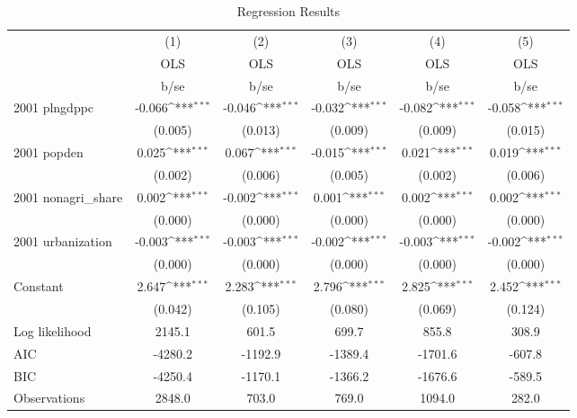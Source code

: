 \begin{table}[htbp]\centering
\def\sym#1{\ifmmode^{#1}\else\(^{#1}\)\fi}
\caption{Regression Results}
\begin{tabular}{l*{5}{c}}
\hline\hline
                    &\multicolumn{1}{c}{(1)}&\multicolumn{1}{c}{(2)}&\multicolumn{1}{c}{(3)}&\multicolumn{1}{c}{(4)}&\multicolumn{1}{c}{(5)}\\
                    &\multicolumn{1}{c}{OLS}&\multicolumn{1}{c}{OLS}&\multicolumn{1}{c}{OLS}&\multicolumn{1}{c}{OLS}&\multicolumn{1}{c}{OLS}\\
                    &        b/se         &        b/se         &        b/se         &        b/se         &        b/se         \\
\hline
2001 plngdppc       &      -0.066\sym{***}&      -0.046\sym{***}&      -0.032\sym{***}&      -0.082\sym{***}&      -0.058\sym{***}\\
                    &     (0.005)         &     (0.013)         &     (0.009)         &     (0.009)         &     (0.015)         \\
2001 popden         &       0.025\sym{***}&       0.067\sym{***}&      -0.015\sym{***}&       0.021\sym{***}&       0.019\sym{***}\\
                    &     (0.002)         &     (0.006)         &     (0.005)         &     (0.002)         &     (0.006)         \\
2001 nonagri\_share  &       0.002\sym{***}&      -0.002\sym{***}&       0.001\sym{***}&       0.002\sym{***}&       0.002\sym{***}\\
                    &     (0.000)         &     (0.000)         &     (0.000)         &     (0.000)         &     (0.000)         \\
2001 urbanization   &      -0.003\sym{***}&      -0.003\sym{***}&      -0.002\sym{***}&      -0.003\sym{***}&      -0.002\sym{***}\\
                    &     (0.000)         &     (0.000)         &     (0.000)         &     (0.000)         &     (0.000)         \\
Constant            &       2.647\sym{***}&       2.283\sym{***}&       2.796\sym{***}&       2.825\sym{***}&       2.452\sym{***}\\
                    &     (0.042)         &     (0.105)         &     (0.080)         &     (0.069)         &     (0.124)         \\
\hline
Log likelihood      &      2145.1         &       601.5         &       699.7         &       855.8         &       308.9         \\
AIC                 &     -4280.2         &     -1192.9         &     -1389.4         &     -1701.6         &      -607.8         \\
BIC                 &     -4250.4         &     -1170.1         &     -1366.2         &     -1676.6         &      -589.5         \\
Observations        &      2848.0         &       703.0         &       769.0         &      1094.0         &       282.0         \\
\hline\hline
\end{tabular}
\end{table}
